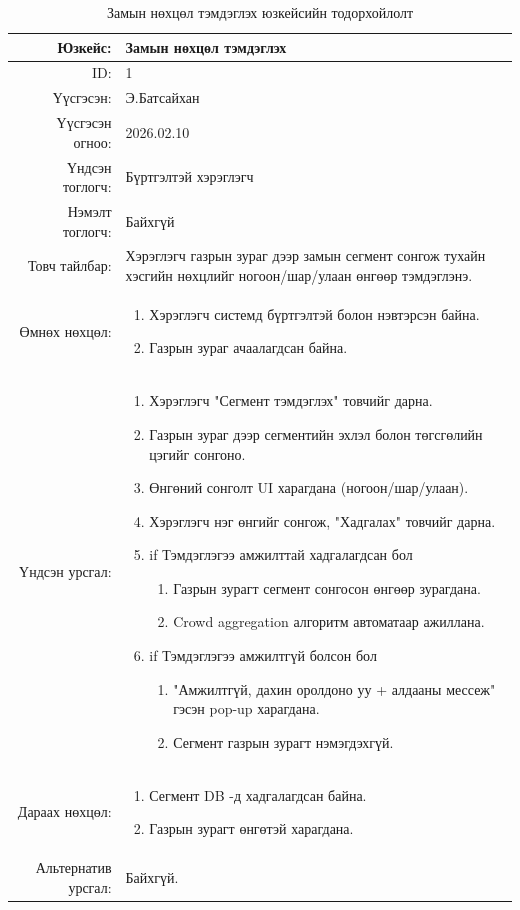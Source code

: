 \begin{longtable}{|r|p{11.5cm}|}
    \caption{Замын нөхцөл тэмдэглэх юзкейсийн тодорхойлолт}
	\label{table:usecase1}\\ \hline
	{Юзкейс:} & {Замын нөхцөл тэмдэглэх }\\ \hline
	{ID:} & {1 }\\ \hline
	{Үүсгэсэн:} & {Э.Батсайхан}\\ \hline
	{Үүсгэсэн огноо:} & {2026.02.10}\\ \hline
	{Үндсэн тоглогч:} & {Бүртгэлтэй хэрэглэгч}\\ \hline
	{Нэмэлт тоглогч:} & {Байхгүй}\\ \hline
	{Товч тайлбар:} & {Хэрэглэгч газрын зураг дээр замын сегмент сонгож тухайн хэсгийн нөхцлийг ногоон/шар/улаан өнгөөр тэмдэглэнэ.}\\ \hline
	{Өмнөх нөхцөл:} & {\begin{enumerate}[nosep]
	    \item Хэрэглэгч системд бүртгэлтэй болон нэвтэрсэн байна.
	    \item Газрын зураг ачаалагдсан байна.
	\end{enumerate}}\\ \hline
	{Үндсэн урсгал:} & {
	\begin{enumerate}[nosep]
	    \item Хэрэглэгч "Сегмент тэмдэглэх" товчийг дарна.
	    \item Газрын зураг дээр сегментийн эхлэл болон төгсгөлийн цэгийг сонгоно.
        \item Өнгөний сонголт UI харагдана (ногоон/шар/улаан).
        \item Хэрэглэгч нэг өнгийг сонгож, "Хадгалах" товчийг дарна.
	    \item if Тэмдэглэгээ амжилттай хадгалагдсан бол
	        \begin{enumerate}[nosep,label*=\arabic*.]
	            \item Газрын зурагт сегмент сонгосон өнгөөр зурагдана.
                \item Crowd aggregation алгоритм автоматаар ажиллана.
	        \end{enumerate}
	    \item if Тэмдэглэгээ амжилтгүй болсон бол
                \begin{enumerate}[nosep,label*=\arabic*.]
	        \item "Амжилтгүй, дахин оролдоно уу + алдааны мессеж" гэсэн pop-up харагдана.
                \item Сегмент газрын зурагт нэмэгдэхгүй.
	    \end{enumerate}
	\end{enumerate}}\\ \hline
	{Дараах нөхцөл:} & {\begin{enumerate}
	    \item Сегмент DB -д хадгалагдсан байна.
        \item Газрын зурагт өнгөтэй харагдана.
	\end{enumerate}}\\ \hline
	{Альтернатив урсгал:} & {Байхгүй.}\\ \hline
\end{longtable}

